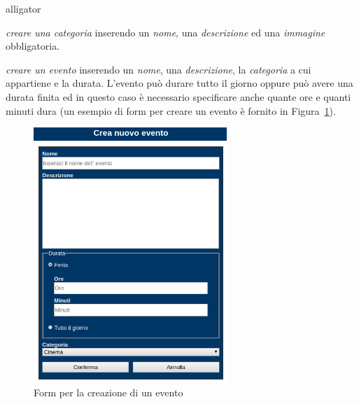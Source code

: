 \documentclass[10pt, a4paper]{article}
\begin{document}
\begin{labeling}{alligator}
	\item[\emph{creare una categoria}] inserendo un \emph{nome}, una \emph{descrizione} ed
	una \emph{immagine} obbligatoria.
	
	\item[\emph{creare un evento}] inserendo un \emph{nome}, una \emph{descrizione},
	la \emph{categoria} a cui appartiene e la durata. L'evento può durare tutto il giorno oppure
	può avere una durata finita ed in questo caso è necessario specificare anche quante ore e
	quanti minuti dura (un esempio di form per creare un evento è fornito in Figura~\ref{fig:creazione_evento}).
	\begin{figure}[h!]
		\centering
		\includegraphics[width=0.65\textwidth]{Images/creazione_evento.png}
		\caption{Form per la creazione di un evento}
		\label{fig:creazione_evento}
	\end{figure}
	

\end{labeling}
\end{document}
